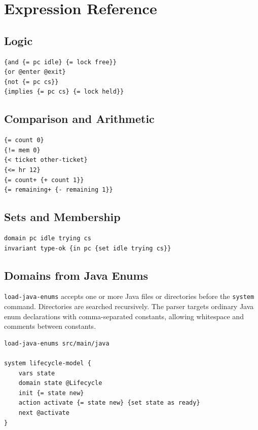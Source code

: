 \documentclass[11pt]{article}
\begin{document}
\section{Expression Reference}

\subsection{Logic}

\begin{lstlisting}[language=TDSTR]
{and {= pc idle} {= lock free}}
{or @enter @exit}
{not {= pc cs}}
{implies {= pc cs} {= lock held}}
\end{lstlisting}

\subsection{Comparison and Arithmetic}

\begin{lstlisting}[language=TDSTR]
{= count 0}
{!= mem 0}
{< ticket other-ticket}
{<= hr 12}
{= count+ {+ count 1}}
{= remaining+ {- remaining 1}}
\end{lstlisting}

\subsection{Sets and Membership}

\begin{lstlisting}[language=TDSTR]
domain pc idle trying cs
invariant type-ok {in pc {set idle trying cs}}
\end{lstlisting}

\subsection{Domains from Java Enums}

\texttt{load-java-enums} accepts one or more Java files or directories before
the \texttt{system} command.  Directories are searched recursively.  The parser
targets ordinary Java enum declarations with comma-separated constants, allowing
whitespace and comments between constants.

\begin{lstlisting}[language=TDSTR]
load-java-enums src/main/java

system lifecycle-model {
    vars state
    domain state @Lifecycle
    init {= state new}
    action activate {= state new} {set state as ready}
    next @activate
}
\end{lstlisting}
\end{document}
